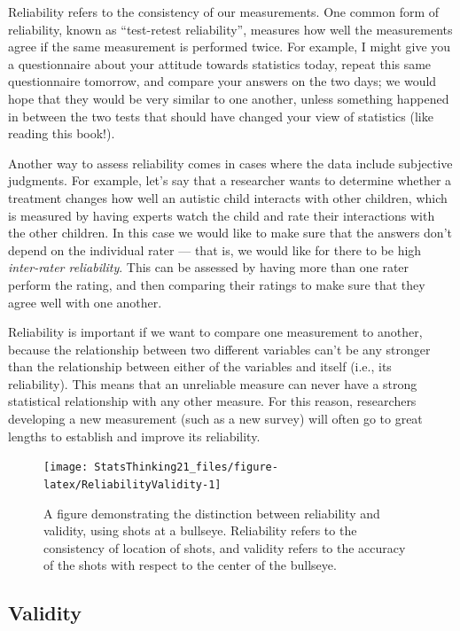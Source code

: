 \documentclass[
  12pt,
]{book}
\begin{document}
Reliability refers to the consistency of our measurements. One common form of reliability, known as ``test-retest reliability'', measures how well the measurements agree if the same measurement is performed twice. For example, I might give you a questionnaire about your attitude towards statistics today, repeat this same questionnaire tomorrow, and compare your answers on the two days; we would hope that they would be very similar to one another, unless something happened in between the two tests that should have changed your view of statistics (like reading this book!).

Another way to assess reliability comes in cases where the data include subjective judgments. For example, let's say that a researcher wants to determine whether a treatment changes how well an autistic child interacts with other children, which is measured by having experts watch the child and rate their interactions with the other children. In this case we would like to make sure that the answers don't depend on the individual rater --- that is, we would like for there to be high \emph{inter-rater reliability}. This can be assessed by having more than one rater perform the rating, and then comparing their ratings to make sure that they agree well with one another.

Reliability is important if we want to compare one measurement to another, because the relationship between two different variables can't be any stronger than the relationship between either of the variables and itself (i.e., its reliability). This means that an unreliable measure can never have a strong statistical relationship with any other measure. For this reason, researchers developing a new measurement (such as a new survey) will often go to great lengths to establish and improve its reliability.

\begin{figure}
\texttt{[image: StatsThinking21\_files/figure-latex/ReliabilityValidity-1]} \caption{A figure demonstrating the distinction between reliability and validity, using shots at a bullseye. Reliability refers to the consistency of location of shots, and validity refers to the accuracy of the shots with respect to the center of the bullseye. }\label{fig:ReliabilityValidity}
\end{figure}

\hypertarget{validity}{%
\subsection{Validity}\label{validity}}
\end{document}
